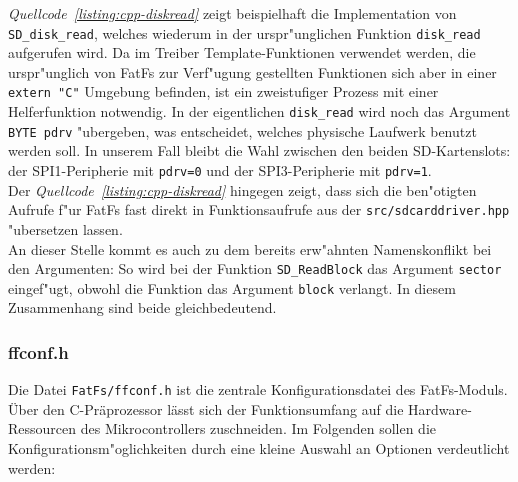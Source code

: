 \documentclass[11pt]{article}
\newcommand*{\coderef}[1]{\textit{Quellcode~\ref{#1}}}
\newcommand{\cpp}[1]{\texttt{#1}}
\begin{document}
\coderef{listing:cpp-diskread} zeigt beispielhaft die Implementation von \cpp{SD_disk_read},
welches wiederum in der urspr"unglichen Funktion \cpp{disk_read} aufgerufen wird. Da im
Treiber Template-Funktionen verwendet werden, die urspr"unglich von FatFs zur Verf"ugung gestellten
Funktionen sich aber in einer \cpp{extern "C"} Umgebung befinden, ist ein zweistufiger Prozess
mit einer Helferfunktion notwendig. In der eigentlichen \cpp{disk_read} wird noch das Argument
\cpp{BYTE pdrv} "ubergeben, was entscheidet, welches physische Laufwerk benutzt werden soll.
In unserem Fall bleibt die Wahl zwischen den beiden SD-Kartenslots: der SPI1-Peripherie mit \cpp{pdrv=0}
und der SPI3-Peripherie mit \cpp{pdrv=1}.\\
Der \coderef{listing:cpp-diskread} hingegen zeigt, dass sich die ben"otigten Aufrufe f"ur FatFs fast
direkt in Funktionsaufrufe aus der \texttt{src/sdcarddriver.hpp} "ubersetzen lassen. \\
An dieser Stelle kommt es auch zu dem bereits erw"ahnten Namenskonflikt bei den Argumenten:
So wird bei der Funktion \cpp{SD_ReadBlock} das Argument \texttt{sector} eingef"ugt, 
obwohl die Funktion das Argument \texttt{block} verlangt. In diesem Zusammenhang sind beide gleichbedeutend.


\subsubsection*{ffconf.h}

Die Datei \texttt{FatFs/ffconf.h} ist die zentrale Konfigurationsdatei des FatFs-Moduls. 
Über den C-Präprozessor lässt sich der Funktionsumfang auf die Hardware-Ressourcen des Mikrocontrollers zuschneiden.
Im Folgenden sollen die Konfigurationsm"oglichkeiten durch eine kleine Auswahl an Optionen verdeutlicht werden: 
\end{document}
